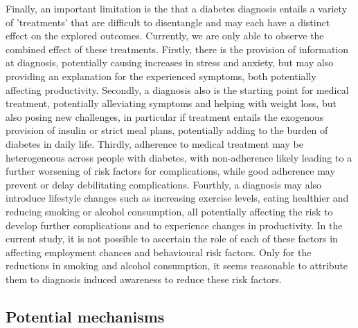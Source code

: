 Finally, an important limitation is the that a diabetes diagnosis entails a variety of 'treatments' that are difficult to disentangle and may each have a distinct effect on the explored outcomes. Currently, we are only able to observe the combined effect of these treatments. Firstly, there is the provision of information at diagnosis, potentially causing increases in stress and anxiety, but may also providing an explanation for the experienced symptoms, both potentially affecting productivity. Secondly, a diagnosis also is the starting point for medical treatment, potentially alleviating symptoms and helping with weight loss, but also posing new challenges, in particular if treatment entails the exogenous provision of insulin or strict meal plans, potentially adding to the burden of diabetes in daily life. Thirdly, adherence to medical treatment may be heterogeneous across people with diabetes, with non-adherence likely leading to a further worsening of risk factors for complications, while good adherence may prevent or delay debilitating complications. Fourthly, a diagnosis may also introduce lifestyle changes such as increasing exercise levels, eating healthier and reducing smoking or alcohol consumption, all potentially affecting the risk to develop further complications and to experience changes in productivity. In the current study, it is not possible to ascertain the role of each of these factors in affecting employment chances and behavioural risk factors. Only for the reductions in smoking and alcohol consumption, it seems reasonable to attribute them to diagnosis induced awareness to reduce these risk factors.


\subsection{Potential mechanisms}

